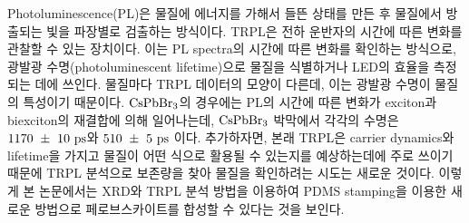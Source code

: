 Photoluminescence(PL)은 물질에 에너지를 가해서 들뜬 상태를 만든 후 물질에서 방출되는 빛을 파장별로 검출하는 방식이다. TRPL은 전하 운반자의 시간에 따른 변화를 관찰할 수 있는 장치이다. 이는 PL spectra의 시간에 따른 변화를 확인하는 방식으로, 광발광 수명(photoluminescent lifetime)으로 물질을 식별하거나 LED의 효율을 측정되는 데에 쓰인다. 물질마다 TRPL 데이터의 모양이 다른데, 이는 광발광 수명이 물질의 특성이기 때문이다. $\rm{CsPbBr_3}$의 경우에는 PL의 시간에 따른 변화가 exciton과 biexciton의 재결합에 의해 일어나는데, $\rm{CsPbBr_3}$ 박막에서 각각의 수명은 $\rm{1170~\pm~10~ps}$와 $\rm{510~\pm~5~ps}$ 이다\cite{chen2018room}. 추가하자면, 본래 TRPL은 carrier dynamics와 lifetime을 가지고 물질이 어떤 식으로 활용될 수 있는지를 예상하는데에 주로 쓰이기 때문에 TRPL 분석으로 보존량을 찾아 물질을 확인하려는 시도는 새로운 것이다. 
이렇게 본 논문에서는 XRD와 TRPL 분석 방법을 이용하여 PDMS stamping을 이용한 새로운 방법으로 페로브스카이트를 합성할 수 있다는 것을 보인다.

